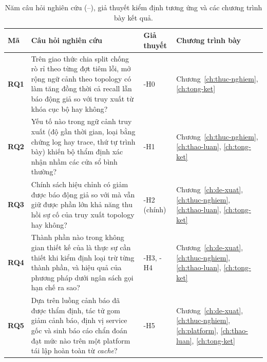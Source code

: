 \begin{table}[H]
  \centering
  \caption[Năm câu hỏi nghiên cứu, giả thuyết tương ứng và chương trả lời]{Năm câu hỏi nghiên cứu (--), giả thuyết kiểm định tương ứng và các chương trình bày kết quả.}
  \label{tab:ch1-rq}
  \tblfont
  \tblsetup
  \setlength{\tabcolsep}{4pt}
  \begin{tabularx}{\linewidth}{|l|Y|>{\raggedright\arraybackslash}p{2.3cm}|>{\raggedright\arraybackslash}p{3.0cm}|}
    \hline
    \textbf{Mã} & \textbf{Câu hỏi nghiên cứu} & \textbf{Giả thuyết} & \textbf{Chương trình bày} \\
    \hline
    \textbf{RQ1} & Trên giao thức chia split chống rò rỉ theo từng đợt tiêm lỗi, mở rộng ngữ cảnh theo topology có làm tăng đồng thời cả recall lẫn báo động giả so với truy xuất từ khóa cục bộ  hay không? & \hyp{H0} & Chương~\ref{ch:thuc-nghiem}, \ref{ch:tong-ket} \\
    \hline
    \textbf{RQ2} & Yếu tố nào trong ngữ cảnh truy xuất (độ gần thời gian, loại bằng chứng log hay trace, thứ tự trình bày) khiến bộ thẩm định  xác nhận nhầm các cửa sổ bình thường? & \hyp{H1} & Chương~\ref{ch:thuc-nghiem}, \ref{ch:thao-luan}, \ref{ch:tong-ket} \\
    \hline
    \textbf{RQ3} & Chính sách hiệu chỉnh \CTAV{} có giảm được báo động giả so với  mà vẫn giữ được phần lớn khả năng thu hồi sự cố của truy xuất topology hay không? & \hyp{H2} (chính) & Chương~\ref{ch:de-xuat}, \ref{ch:thuc-nghiem}, \ref{ch:thao-luan}, \ref{ch:tong-ket} \\
    \hline
    \textbf{RQ4} & Thành phần nào trong không gian thiết kế của \CTAV{} là thực sự cần thiết khi kiểm định loại trừ từng thành phần, và hiệu quả của phương pháp dưới ngân sách gọi  hạn chế ra sao? & \hyp{H3}, \hyp{H4} & Chương~\ref{ch:de-xuat}, \ref{ch:thuc-nghiem}, \ref{ch:thao-luan}, \ref{ch:tong-ket} \\
    \hline
    \textbf{RQ5} & Dựa trên luồng cảnh báo đã được \CTAV{} thẩm định, tác tử  gom giảm cảnh báo, định vị service gốc và sinh báo cáo chẩn đoán đạt mức nào trên một platform tái lập hoàn toàn từ \textit{cache}? & \hyp{H5} & Chương~\ref{ch:de-xuat}, \ref{ch:thuc-nghiem}, \ref{ch:platform}, \ref{ch:thao-luan}, \ref{ch:tong-ket} \\
    \hline
  \end{tabularx}
\end{table}

